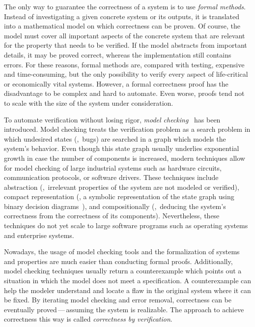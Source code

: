The only way to guarantee the correctness of a system is to use \emph{formal methods}. Instead of investigating a given concrete system or its outputs, it is translated into a mathematical model on which correctness can be proven. Of course, the model must cover all important aspects of the concrete system that are relevant for the property that needs to be verified. If the model abstracts from important details, it may be proved correct, whereas the implementation still contains errors. For these reasons, formal methods are, compared with testing, expensive and time-consuming, but the only possibility to verify every aspect of life-critical or economically vital systems. However, a formal correctness proof has the disadvantage to be complex and hard to automate. Even worse, proofs tend not to scale with the size of the system under consideration.

To automate verification without losing rigor, \emph{model checking}~\cite{ClarkeGD_1999_book} has been introduced. Model checking treats the verification problem as a search problem in which undesired states (\ie,~bugs) are searched in a graph which models the system's behavior. Even though this state graph usually underlies exponential growth in case the number of components is increased, modern techniques allow for model checking of large industrial systems such as hardware circuits, communication protocols, or software drivers. These techniques include abstraction (\ie,~irrelevant properties of the system are not modeled or verified), compact representation (\eg, a symbolic representation of the state graph using binary decision diagrams~\cite{Bryant_1986_tc}), and compositionally (\ie,~deducing the system's correctness from the correctness of its components). Nevertheless, these techniques do not yet scale to large software programs such as operating systems and enterprise systems.

Nowadays, the usage of model checking tools and the formalization of systems and properties are much easier than conducting formal proofs. Additionally, model checking techniques usually return a counterexample which points out a situation in which the model does not meet a specification. A counterexample can help the modeler understand and locate a flaw in the original system where it can be fixed. By iterating model checking and error removal, correctness can be eventually proved\,---\,assuming the system is realizable. The approach to achieve correctness this way is called \emph{correctness by verification}.

